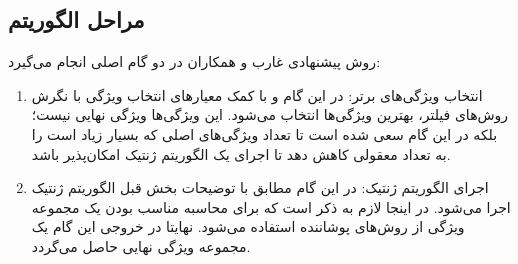 \subsection{مراحل الگوریتم}
روش پیشنهادی غارب و همکاران در دو گام اصلی انجام می‌گیرد:
\begin{enumerate}
\item انتخاب ویژگی‌های برتر: در این گام و با کمک معیارهای انتخاب ویژگی با نگرش روش‌های فیلتر، بهترین ویژگی‌ها انتخاب می‌شود. این ویژگی‌ها ویژگی نهایی نیست؛ بلکه در این گام سعی شده است تا تعداد ویژگی‌های اصلی که بسیار زیاد است را به تعداد معقولی کاهش دهد تا اجرای یک الگوریتم ژنتیک امکان‌پذیر باشد.
\item اجرای الگوریتم ژنتیک: در این گام مطابق با توضیحات بخش قبل الگوریتم ژنتیک اجرا می‌شود. در اینجا لازم به ذکر است که برای محاسبه مناسب بودن یک مجموعه ویژگی از روش‌های پوشاننده استفاده می‌شود. نهایتا در خروجی این گام یک مجموعه ویژگی نهایی حاصل می‌گردد.
\end{enumerate}